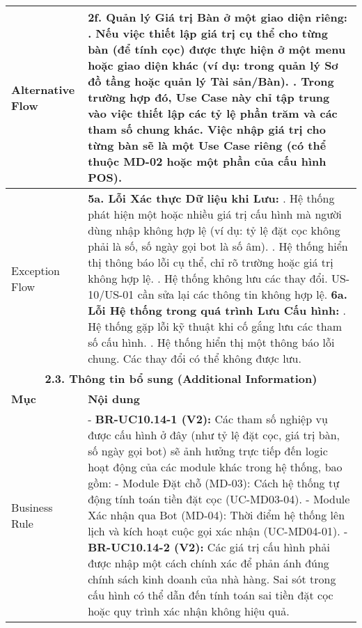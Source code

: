 \begin{longtable}{|m{4cm}|p{11cm}|}
\hline
Alternative Flow & \textbf{2f. Quản lý Giá trị Bàn ở một giao diện riêng:} \newline    1. Nếu việc thiết lập giá trị cụ thể cho từng bàn (để tính cọc) được thực hiện ở một menu hoặc giao diện khác (ví dụ: trong quản lý Sơ đồ tầng hoặc quản lý Tài sản/Bàn). \newline    2. Trong trường hợp đó, Use Case này chỉ tập trung vào việc thiết lập các tỷ lệ phần trăm và các tham số chung khác. Việc nhập giá trị cho từng bàn sẽ là một Use Case riêng (có thể thuộc MD-02 hoặc một phần của cấu hình POS). \\
\hline
Exception Flow & \textbf{5a. Lỗi Xác thực Dữ liệu khi Lưu:} \newline    1. Hệ thống phát hiện một hoặc nhiều giá trị cấu hình mà người dùng nhập không hợp lệ (ví dụ: tỷ lệ đặt cọc không phải là số, số ngày gọi bot là số âm). \newline    2. Hệ thống hiển thị thông báo lỗi cụ thể, chỉ rõ trường hoặc giá trị không hợp lệ. \newline    3. Hệ thống không lưu các thay đổi. US-10/US-01 cần sửa lại các thông tin không hợp lệ. \newline \textbf{6a. Lỗi Hệ thống trong quá trình Lưu Cấu hình:} \newline    1. Hệ thống gặp lỗi kỹ thuật khi cố gắng lưu các tham số cấu hình. \newline    2. Hệ thống hiển thị một thông báo lỗi chung. Các thay đổi có thể không được lưu. \\
\hline
\multicolumn{2}{|c|}{\textbf{2.3. Thông tin bổ sung (Additional Information)}} \\
\hline
\textbf{Mục} & \textbf{Nội dung} \\
\hline
Business Rule & - \textbf{BR-UC10.14-1 (V2):} Các tham số nghiệp vụ được cấu hình ở đây (như tỷ lệ đặt cọc, giá trị bàn, số ngày gọi bot) sẽ ảnh hưởng trực tiếp đến logic hoạt động của các module khác trong hệ thống, bao gồm: \newline    - Module Đặt chỗ (MD-03): Cách hệ thống tự động tính toán tiền đặt cọc (UC-MD03-04). \newline    - Module Xác nhận qua Bot (MD-04): Thời điểm hệ thống lên lịch và kích hoạt cuộc gọi xác nhận (UC-MD04-01). \newline - \textbf{BR-UC10.14-2 (V2):} Các giá trị cấu hình phải được nhập một cách chính xác để phản ánh đúng chính sách kinh doanh của nhà hàng. Sai sót trong cấu hình có thể dẫn đến tính toán sai tiền đặt cọc hoặc quy trình xác nhận không hiệu quả. \\

\end{longtable}
